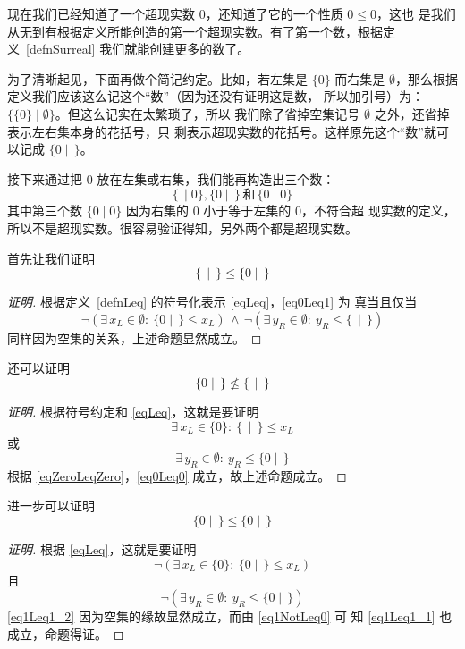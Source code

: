\documentclass[cs4size,a4paper,adobefonts]{ctexart}
\numberwithin{equation}{section}
\begin{document}
现在我们已经知道了一个超现实数 $0$，还知道了它的一个性质 $0\leq0$，这也
是我们从无到有根据定义所能创造的第一个超现实数。有了第一个数，根据定
义~\ref{defnSurreal} 我们就能创建更多的数了。

为了清晰起见，下面再做个简记约定。比如，若左集是 $\{0\}$ 而右集是
$\emptyset$，那么根据定义我们应该这么记这个“数”（因为还没有证明这是数，
  所以加引号）为：$\{\{0\}\mid\emptyset\}$。但这么记实在太繁琐了，所以
我们除了省掉空集记号 $\emptyset$ 之外，还省掉表示左右集本身的花括号，只
剩表示超现实数的花括号。这样原先这个“数”就可以记成 $\{0\mid\,\}$。

接下来通过把 $0$ 放在左集或右集，我们能再构造出三个数：
\[
\{\,\mid 0\},\{0\mid\,\}\,\text{和}\,\{0\mid 0\}
\]
其中第三个数 $\{0\mid 0\}$ 因为右集的 $0$ 小于等于左集的 $0$，不符合超
现实数的定义，所以不是超现实数。很容易验证得知，另外两个都是超现实数。

首先让我们证明
\begin{equation}
  \label{eq0Leq1}
  \{\,\mid\,\}\leq\{0\mid\,\}
\end{equation}
\begin{proof}[证明]
  根据定义~\ref{defnLeq} 的符号化表示 \eqref{eqLeq}，\eqref{eq0Leq1} 为
  真当且仅当
  \[
  \neg(\exists\, x_L \in \emptyset :\: \{0\mid\,\} \leq x_L)\, \wedge \,
  \neg(\exists\, y_R \in \emptyset :\: y_R \leq \{\,\mid\,\})
  \]
  同样因为空集的关系，上述命题显然成立。
\end{proof}

还可以证明
\begin{equation}
  \label{eq1NotLeq0}
  \{0\mid\,\}\nleq\{\,\mid\,\}
\end{equation}
\begin{proof}[证明]
  根据符号约定和 \eqref{eqLeq}，这就是要证明
  \begin{equation}
    \label{eq0Leq0}
    \exists\, x_L \in \{0\} :\: \{\,\mid\,\} \leq x_L
  \end{equation}
  或
  \[
  \exists\, y_R \in \emptyset :\: y_R \leq \{0\mid\,\}
  \]
  根据 \eqref{eqZeroLeqZero}，\eqref{eq0Leq0} 成立，故上述命题成立。
\end{proof}

进一步可以证明
\begin{equation}
  \label{eq1Leq1}
   \{0\mid\,\}\leq \{0\mid\,\}
\end{equation}
\begin{proof}[证明]
  根据 \eqref{eqLeq}，这就是要证明
  \begin{equation}
    \label{eq1Leq1_1}
    \neg(\exists\, x_L \in \{0\} :\: \{0\mid\,\} \leq x_L)    
  \end{equation}
  且
  \begin{equation}
    \label{eq1Leq1_2}
    \neg(\exists\, y_R \in \emptyset :\: y_R \leq \{0\mid\,\})
  \end{equation}
  \eqref{eq1Leq1_2} 因为空集的缘故显然成立，而由 \eqref{eq1NotLeq0} 可
  知 \eqref{eq1Leq1_1} 也成立，命题得证。
\end{proof}
\end{document}
